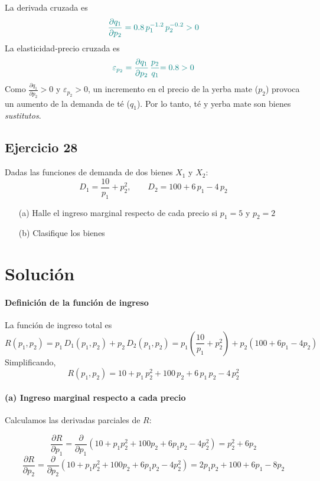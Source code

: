 \documentclass{article}
\begin{document}
La derivada cruzada es
\[
\color{teal}{\frac{\partial q_1}{\partial p_2} = 0.8\,p_1^{-1.2}\,p_2^{-0.2}>0}
\]
La elasticidad‑precio cruzada es
\[\color{teal}
\varepsilon_{p_2}
=\frac{\partial q_1}{\partial p_2}\,\frac{p_2}{q_1}
\color{teal}{= 0.8>0}
\]
Como \(\frac{\partial q_1}{\partial p_2}>0\) y \(\varepsilon_{p_2}>0\), un incremento en el precio de la yerba mate (\(p_2\)) provoca un aumento de la demanda de té (\(q_1\)). {\color{teal}Por lo tanto, té y yerba mate son bienes \emph{sustitutos}}.

\newpage

\subsection{Ejercicio 28}

Dadas las funciones de demanda de dos bienes \(X_1\) y \(X_2\):
\[
D_1 = \frac{10}{p_1} + p_2^2,
\qquad
D_2 = 100 + 6\,p_1 - 4\,p_2
\]
\begin{enumerate}
  \item[(a)] Halle el ingreso marginal respecto de cada precio si \(p_1 = 5\) y \(p_2 = 2\)
  \item[(b)] Clasifique los bienes
\end{enumerate}

\newpage
\section*{Solución}

\paragraph{Definición de la función de ingreso}  
La función de ingreso total es
\[
R(p_1,p_2)
= p_1\,D_1(p_1,p_2) + p_2\,D_2(p_1,p_2)
= p_1\left(\frac{10}{p_1} + p_2^2\right)
+ p_2\left(100 + 6p_1 - 4p_2\right)
\]
Simplificando,
\[
R(p_1,p_2)
= 10 + p_1\,p_2^2 + 100\,p_2 + 6\,p_1\,p_2 - 4\,p_2^2
\]

\paragraph{(a) Ingreso marginal respecto a cada precio}  
Calculamos las derivadas parciales de \(R\):

\[
\frac{\partial R}{\partial p_1}
= \frac{\partial}{\partial p_1}\left(10 + p_1p_2^2 + 100p_2 + 6p_1p_2 - 4p_2^2\right)
= p_2^2 + 6p_2
\]
\[
\frac{\partial R}{\partial p_2}
= \frac{\partial}{\partial p_2}\left(10 + p_1p_2^2 + 100p_2 + 6p_1p_2 - 4p_2^2\right)
= 2p_1p_2 + 100 + 6p_1 - 8p_2
\]
\end{document}
